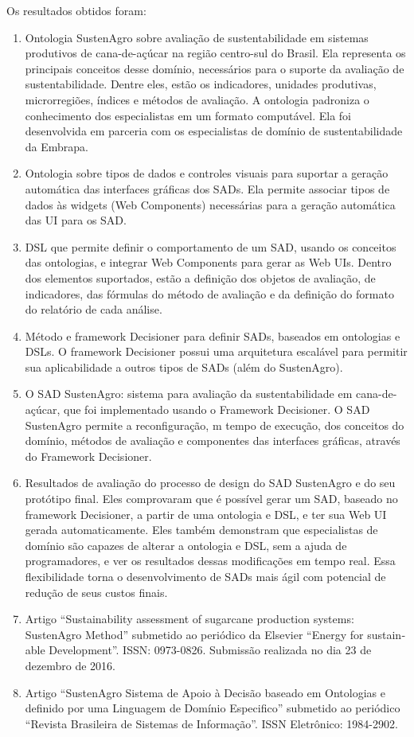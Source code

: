 Os resultados obtidos foram: 
\begin{enumerate}
\item Ontologia SustenAgro sobre avaliação de sustentabilidade em sistemas
produtivos de cana-de-açúcar na região centro-sul do Brasil. Ela representa
os principais conceitos desse domínio, necessários para o suporte
da avaliação de sustentabilidade. Dentre eles, estão os indicadores,
unidades produtivas, microrregiões, índices e métodos de avaliação.
A ontologia padroniza o conhecimento dos especialistas em um formato
computável. Ela foi desenvolvida em parceria com os especialistas
de domínio de sustentabilidade da Embrapa.
\item Ontologia sobre tipos de dados e controles visuais para suportar a
geração automática das interfaces gráficas dos SADs. Ela permite associar
tipos de dados às \foreignlanguage{english}{widgets} (Web Components)
necessárias para a geração automática das UI para os SAD.
\item DSL que permite definir o comportamento de um SAD, usando os conceitos
das ontologias, e integrar \foreignlanguage{english}{Web Components}
para gerar as Web UIs. Dentro dos elementos suportados, estão a definição
dos objetos de avaliação, de indicadores, das fórmulas do método de
avaliação e da definição do formato do relatório de cada análise.
\item Método e framework Decisioner para definir SADs, baseados em ontologias
e DSLs. O framework Decisioner possui uma arquitetura escalável para
permitir sua aplicabilidade a outros tipos de SADs (além do SustenAgro).
\item O SAD SustenAgro: sistema para avaliação da sustentabilidade em cana-de-açúcar,
que foi implementado usando o Framework Decisioner. O SAD SustenAgro
permite a reconfiguração, m tempo de execução, dos conceitos do domínio,
métodos de avaliação e componentes das interfaces gráficas, através
do \foreignlanguage{english}{Framework Decisioner}.
\item Resultados de avaliação do processo de design do SAD SustenAgro e
do seu protótipo final. Eles comprovaram que é possível gerar um SAD,
baseado no framework Decisioner, a partir de uma ontologia e DSL,
e ter sua Web UI gerada automaticamente. Eles também demonstram que
especialistas de domínio são capazes de alterar a ontologia e DSL,
sem a ajuda de programadores, e ver os resultados dessas modificações
em tempo real. Essa flexibilidade torna o desenvolvimento de SADs
mais ágil com potencial de redução de seus custos finais.
\item Artigo “\foreignlanguage{english}{Sustainability assessment of sugarcane
production systems: SustenAgro Method}” submetido ao periódico da
\foreignlanguage{english}{Elsevier “Energy for sustainable Development”.}
ISSN: 0973-0826. Submissão realizada no dia 23 de dezembro de 2016.
\item Artigo ``SustenAgro Sistema de Apoio à Decisão baseado em Ontologias
e definido por uma Linguagem de Domínio Especifico'' submetido ao
periódico ``Revista Brasileira de Sistemas de Informação''. ISSN
Eletrônico: 1984-2902.
\end{enumerate}


